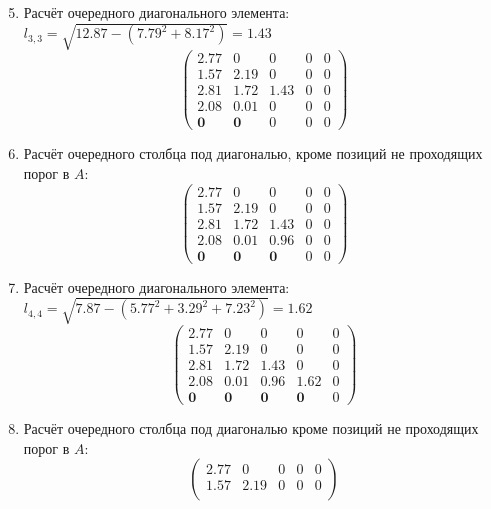 \begin{multicols}{3}
    \columnbreak
    \begin{enumerate}
    \setcounter{enumi}{4}
        \item Расчёт очередного диагонального элемента: $l_{3,3} = \sqrt{12.87 - (7.79^2+8.17^2)} = 1.43$
    $$\begin{pmatrix}
        2.77 & 0     & 0    & 0 & 0 \\
        1.57 & 2.19  & 0    & 0 & 0 \\
        2.81 & 1.72  & 1.43 & 0 & 0 \\
        2.08 & 0.01  & 0    & 0 & 0 \\
         \mathbf{0}    &  \mathbf{0}     & 0    & 0 & 0
    \end{pmatrix}$$
    \vspace{-0.5cm}
    \item Расчёт очередного столбца под диагональю, кроме позиций не проходящих порог в $A$:
    $$\begin{pmatrix}
        2.77 & 0    & 0    & 0 & 0 \\
        1.57 & 2.19 & 0    & 0 & 0 \\
        2.81 & 1.72 & 1.43 & 0 & 0 \\
        2.08 & 0.01 & 0.96 & 0 & 0 \\
         \mathbf{0}    &  \mathbf{0}    & \mathbf{0}    & 0 & 0
    \end{pmatrix}$$
    \vspace{-0.5cm}
    \item Расчёт очередного диагонального элемента: $l_{4,4} = \sqrt{7.87 - (5.77^2+3.29^2+7.23^2)} = 1.62$
    $$\begin{pmatrix}
        2.77 & 0     & 0    & 0    & 0 \\
        1.57 & 2.19  & 0    & 0    & 0 \\
        2.81 & 1.72  & 1.43 & 0    & 0 \\
        2.08 & 0.01  & 0.96 & 1.62 & 0 \\
         \mathbf{0}    &  \mathbf{0}     &  \mathbf{0}    &  \mathbf{0}    & 0
    \end{pmatrix}$$
    \vspace{-0.5cm}
    \item Расчёт очередного столбца под диагональю кроме позиций не проходящих порог в $A$:
    $$\begin{pmatrix}
        2.77 & 0     & 0    & 0          & 0 \\
        1.57 & 2.19  & 0    & 0          & 0 \\

\end{pmatrix}$$
\end{enumerate}
\end{multicols}
